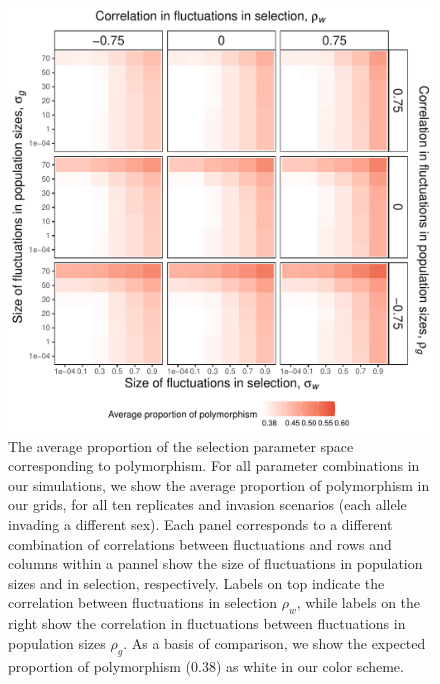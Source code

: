 \documentclass[12pt]{article}
\begin{document}
\begin{figure}[H]
  \centerline{\includegraphics[]{heat_map.pdf}}
  \caption{The average proportion of the selection parameter space corresponding to polymorphism. For all parameter combinations in our simulations, we show the average proportion of polymorphism in our grids, for all ten replicates and invasion scenarios (each allele invading a different sex). Each panel corresponds to a different combination of correlations between fluctuations and rows and columns within a pannel show the size of fluctuations in population sizes and in selection, respectively. Labels on top indicate the correlation between fluctuations in selection $\rho_{w}$, while labels on the right show the correlation in fluctuations between fluctuations in population sizes $\rho_{g}$.  As a basis of comparison, we show the expected proportion of polymorphism ($ 0.38$) as white in our color scheme.  }
    \label{fig:heatmap}
\end{figure}
\end{document}
